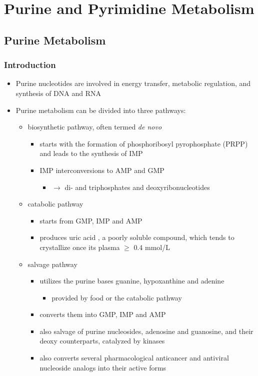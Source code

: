 \documentclass{scrartcl}
\begin{document}
\section{Purine and Pyrimidine Metabolism}
\label{sec:org7d31a2e}
\subsection{Purine Metabolism}
\label{sec:orgb189d29}
\subsubsection{Introduction}
\label{sec:org2e475c5}
\begin{itemize}
\item Purine nucleotides are involved in energy transfer, metabolic
regulation, and synthesis of DNA and RNA
\item Purine metabolism can be divided into three pathways:
\begin{itemize}
\item biosynthetic pathway, often termed \emph{de novo}
\begin{itemize}
\item starts with the formation of phosphoribosyl pyrophosphate (PRPP)
and leads to the synthesis of IMP
\item IMP interconversions to AMP and GMP
\begin{itemize}
\item \(\to\) di- and triphosphates and deoxyribonucleotides
\end{itemize}
\end{itemize}
\item catabolic pathway
\begin{itemize}
\item starts from GMP, IMP and AMP
\item produces uric acid , a poorly soluble compound, which tends to
crystallize once its plasma \(\ge\) 0.4 mmol/L
\end{itemize}
\item salvage pathway
\begin{itemize}
\item utilizes the purine bases guanine, hypoxanthine and adenine
\begin{itemize}
\item provided by food or the catabolic pathway
\end{itemize}
\item converts them into GMP, IMP and AMP
\item also salvage of purine nucleosides, adenosine and guanosine, and
their deoxy counterparts, catalyzed by kinases
\item also converts several pharmacological anticancer and antiviral
nucleoside analogs into their active forms
\end{itemize}
\end{itemize}


\end{itemize}
\end{document}
